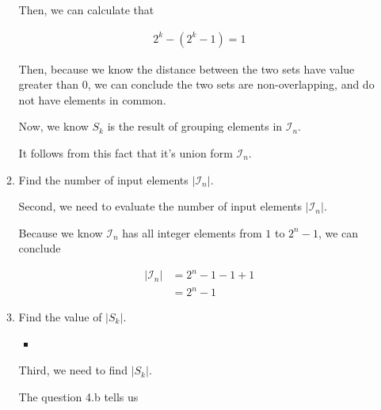 \documentclass[12pt]{article}
\begin{document}
\begin{enumerate}[a.]
\begin{mdframed}
\begin{enumerate}[1.]
\begin{mdframed}
            \bigskip

            Then, we can calculate that

            \begin{align}
                2^k - (2^k - 1) = 1
            \end{align}

            \bigskip

            Then, because we know the distance between the two sets have value greater than 0, we can
            conclude the two sets are non-overlapping, and do not have elements in common.

            \bigskip

            Now, we know $S_k$ is the result of grouping elements in $\mathcal{I}_n$.

            \bigskip

            It follows from this fact that it's union form $\mathcal{I}_n$.
        \end{mdframed}

        \item Find the number of input elements $\lvert \mathcal{I}_n \rvert$.

        \begin{mdframed}
        Second, we need to evaluate the number of input elements $\lvert \mathcal{I}_n \rvert$.

        \bigskip

        Because we know $\mathcal{I}_n$ has all integer elements from $1$ to $2^n - 1$,
        we can conclude

        \begin{align}
            \lvert \mathcal{I}_n \rvert &= 2^n - 1 - 1 + 1\\
            &= 2^n - 1
        \end{align}
        \end{mdframed}

        \item Find the value of $\lvert S_k \rvert$.

        \begin{itemize}
            \item
        \end{itemize}

        \begin{mdframed}
        Third, we need to find $\lvert S_k \rvert$.

        \bigskip

        The question 4.b tells us


\end{mdframed}
\end{enumerate}
\end{mdframed}
\end{enumerate}
\end{document}
